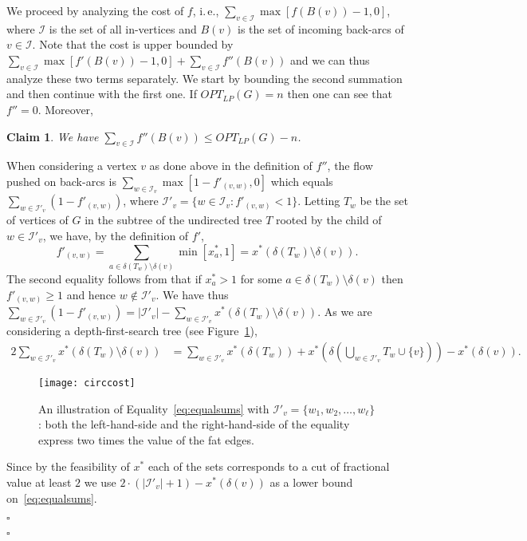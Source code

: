 \documentclass[letterpaper,11pt]{article}
\newtheorem{claim}[theorem]{Claim}
\newenvironment{proofclaim}{\begin{trivlist}
\item[\hskip\labelsep {\it Proof of Claim}.]}{\QED \end{trivlist}}
\newenvironment{proof}{\begin{trivlist}
\item[\hskip\labelsep {\bf Proof}.]}{\QED \end{trivlist}}
\newcommand{\QED}{\hfill $\square$}
\newcommand{\OLP}[1]{\ensuremath{OPT_{LP}(#1)}}
\begin{document}
\begin{proof}
  We proceed by analyzing the cost of $f$, i.\,e., $\sum_{v\in
    \mathcal{I}} \max[f(B(v)) -1, 0]$, where $\mathcal{I}$ is the set
  of all in-vertices and $B(v)$ is the set of incoming back-arcs of
  $v\in \mathcal{I}$. Note that the cost is upper bounded by
  $\sum_{v\in \mathcal{I}} \max[f'(B(v)) -1, 0] + \sum_{v\in
    \mathcal{I}} f''(B(v))$ and we can thus analyze these two terms
  separately. We start by bounding the second summation and then
  continue with the first one. If $\OLP{G} = n$ then one can see that $f'' = 0$. Moreover,
  \begin{claim}
    \label{claim:firstcost}
    We have $\sum_{v\in \mathcal{I}} f''(B(v)) \leq \OLP{G}-n$.
  \end{claim}
  \begin{proofclaim}
    When considering a vertex $v$ as done above in the definition of
    $f''$, the flow pushed on back-arcs is $\sum_{w\in \mathcal{I}_v}
    \max[1-f'_{(v,w)}, 0]$ which equals $\sum_{w\in \mathcal{I}'_v}
    (1-f'_{(v,w)})$, where $\mathcal{I}'_v = \{w \in \mathcal{I}_v: f'_{(v,w)} < 1\}$. Letting $T_w$ be the set of vertices of $G$ in the
    subtree of the undirected tree $T$ rooted by the child of  $w\in \mathcal{I}'_v$,
    we have, by the definition of $f'$,
$$
f'_{(v,w)} = \sum_{a\in \delta(T_w)\setminus \delta(v)} \min[x^*_a, 1]
= x^*(\delta(T_w) \setminus \delta(v)).
$$
The second equality follows from that if $x^*_a > 1$ for some $a\in
\delta(T_w) \setminus \delta(v)$ then $f'_{(v,w)} \geq 1$ and hence $w\not \in \mathcal{I}'_v$. We have thus 
$
\sum_{w\in \mathcal{I}'_v} (1- f'_{(v,w)}) = |\mathcal{I}'_v| -
\sum_{w\in \mathcal{I}'_v} x^*(\delta(T_w) \setminus \delta(v)).
$
As we are considering a depth-first-search tree (see
Figure~\ref{fig:circcostOLA}),
\begin{align}
\label{eq:equalsums}
2 \sum_{w\in \mathcal{I}'_v} x^*(\delta(T_w) \setminus \delta(v)) &=  
\sum_{w\in \mathcal{I}'_v} x^*(\delta(T_w)) +
x^*\left(\delta\left(\bigcup_{w\in \mathcal{I}'_v} T_w \cup
    \{v\}\right)\right) - x^*(\delta(v)).
\end{align}
\begin{figure}[bt]
\begin{center}
\texttt{[image: circcost]}
\end{center}
\caption{An illustration of Equality~\eqref{eq:equalsums} with $\mathcal{I}'_v = \{w_1, w_2, \dots, w_\ell\}$: both the
  left-hand-side and the right-hand-side of the equality express two
  times the value of the fat edges.}
\label{fig:circcostOLA}
\end{figure}
Since by the feasibility of $x^*$ each of the sets corresponds to a cut of fractional value at least $2$ we use $2\cdot (|\mathcal{I}'_v| + 1) - x^*(\delta(v))$ as a lower bound on~\eqref{eq:equalsums}.


\end{proofclaim}
\end{proof}
\end{document}
